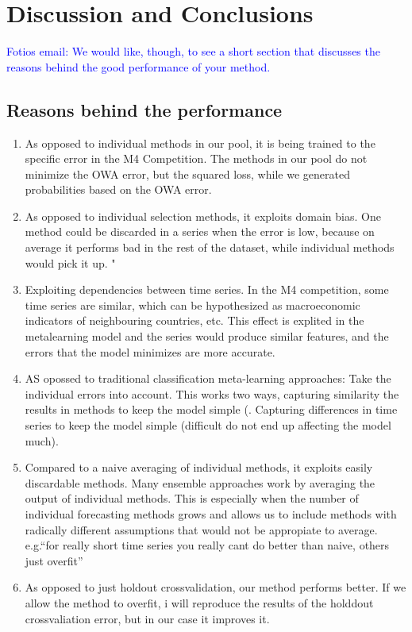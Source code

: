 \documentclass[11pt,a4paper,]{article}
\providecommand{\tightlist}{%
  \setlength{\itemsep}{0pt}\setlength{\parskip}{0pt}}
\theoremstyle{definition}
\theoremstyle{definition}
\theoremstyle{definition}
\theoremstyle{remark}
\begin{document}
\section{Discussion and Conclusions}\label{discussion-and-conclusions}

\textcolor{blue}{Fotios email: We would like, though, to see a short section that discusses the reasons behind the good performance of your method. }

\subsection{Reasons behind the
performance}\label{reasons-behind-the-performance}

\begin{enumerate}
\def\labelenumi{\arabic{enumi}.}
\tightlist
\item
  As opposed to individual methods in our pool, it is being trained to
  the specific error in the M4 Competition. The methods in our pool do
  not minimize the OWA error, but the squared loss, while we generated
  probabilities based on the OWA error.
\item
  As opposed to individual selection methods, it exploits domain bias.
  One method could be discarded in a series when the error is low,
  because on average it performs bad in the rest of the dataset, while
  individual methods would pick it up. "
\item
  Exploiting dependencies between time series. In the M4 competition,
  some time series are similar, which can be hypothesized as
  macroeconomic indicators of neighbouring countries, etc. This effect
  is explited in the metalearning model and the series would produce
  similar features, and the errors that the model minimizes are more
  accurate.
\item
  AS opossed to traditional classification meta-learning approaches:
  Take the individual errors into account. This works two ways,
  capturing similarity the results in methods to keep the model simple
  (. Capturing differences in time series to keep the model simple
  (difficult do not end up affecting the model much).
\item
  Compared to a naive averaging of individual methods, it exploits
  easily discardable methods. Many ensemble approaches work by averaging
  the output of individual methods. This is especially when the number
  of individual forecasting methods grows and allows us to include
  methods with radically different assumptions that would not be
  appropiate to average. e.g.``for really short time series you really
  cant do better than naive, others just overfit''
\item
  As opposed to just holdout crossvalidation, our method performs
  better. If we allow the method to overfit, i will reproduce the
  results of the holddout crossvaliation error, but in our case it
  improves it.
\end{enumerate}

\printbibliography[title=References]
\end{document}
